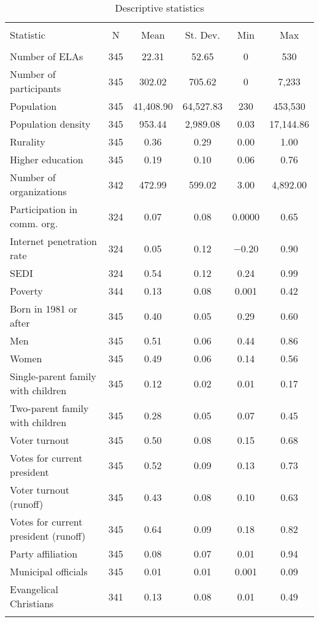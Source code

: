 \documentclass[onecolumn]{article}
\begin{document}
 
\begin{table}[!htbp] \centering 
  \caption{Descriptive statistics} 
  \label{tab:stats} 
\begin{tabular}{@{\extracolsep{5pt}}lccccc} 
\\[-1.8ex]\hline 
\hline \\[-1.8ex] 
Statistic & \multicolumn{1}{c}{N} & \multicolumn{1}{c}{Mean} & \multicolumn{1}{c}{St. Dev.} & \multicolumn{1}{c}{Min} & \multicolumn{1}{c}{Max} \\ 
\hline \\[-1.8ex] 
Number of ELAs  & 345 & 22.31 & 52.65 & 0 & 530 \\ 
Number of participants & 345 & 302.02 & 705.62 & 0 & 7,233 \\ 
Population & 345 & 41,408.90 & 64,527.83 & 230 & 453,530 \\
Population density  & 345 & 953.44 & 2,989.08 & 0.03 & 17,144.86 \\ 
Rurality & 345 & 0.36 & 0.29 & 0.00 & 1.00 \\ 
Higher education & 345 & 0.19 & 0.10 & 0.06 & 0.76 \\ 
Number of organizations & 342 & 472.99 & 599.02 & 3.00 & 4,892.00 \\ 
Participation in comm. org. & 324 & 0.07 & 0.08 & 0.0000 & 0.65 \\ 
Internet penetration rate & 324 & 0.05 & 0.12 & $-$0.20 & 0.90 \\ 
SEDI & 324 & 0.54 & 0.12 & 0.24 & 0.99 \\ 
Poverty & 344 & 0.13 & 0.08 & 0.001 & 0.42 \\
Born in 1981 or after & 345 & 0.40 & 0.05 & 0.29 & 0.60 \\ 
Men & 345 & 0.51 & 0.06 & 0.44 & 0.86 \\ 
Women & 345 & 0.49 & 0.06 & 0.14 & 0.56 \\ 
Single-parent family with children & 345 & 0.12 & 0.02 & 0.01 & 0.17 \\ 
Two-parent family with children & 345 & 0.28 & 0.05 & 0.07 & 0.45 \\ 
Voter turnout  & 345 & 0.50 & 0.08 & 0.15 & 0.68 \\ 
Votes for current president & 345 & 0.52 & 0.09 & 0.13 & 0.73 \\ 
Voter turnout (runoff) & 345 & 0.43 & 0.08 & 0.10 & 0.63 \\
Votes for current president (runoff) & 345 & 0.64 & 0.09 & 0.18 & 0.82 \\ 
Party affiliation & 345 & 0.08 & 0.07 & 0.01 & 0.94 \\ 
Municipal officials & 345 & 0.01 & 0.01 & 0.001 & 0.09 \\ 
Evangelical Christians & 341 & 0.13 & 0.08 & 0.01 & 0.49 \\ 
\hline \\[-1.8ex] 
\end{tabular} 
\end{table} 
\end{document}
